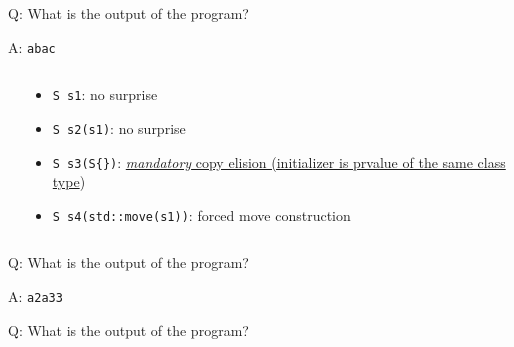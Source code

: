 \begin{frame}[fragile]{Q: What is the output of the program?}
\end{frame}

\begin{frame}[fragile]{A: \texttt{abac}}
    \begin{columns}
        \begin{column}{.5\textwidth}
        \end{column}
        \begin{column}{.45\textwidth}
            \begin{itemize}
                \item \texttt{S s1}: no surprise
                \item \texttt{S s2(s1)}: no surprise
                \item \texttt{S s3(S\{\})}: \href{https://en.cppreference.com/w/cpp/language/copy_elision}{\textit{mandatory} copy elision (initializer is prvalue of the same class type})
                \item \texttt{S s4(std::move(s1))}: forced move construction
            \end{itemize}
        \end{column}
    \end{columns}
\end{frame}

\begin{frame}[fragile]{Q: What is the output of the program?}
\end{frame}

\begin{frame}[fragile]{A: \texttt{a2a33}}
\end{frame}

\begin{frame}[fragile]{Q: What is the output of the program?}
\end{frame}

